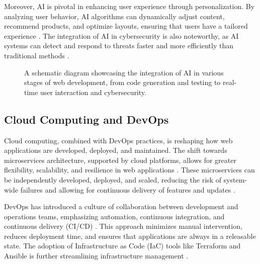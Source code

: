 Moreover, AI is pivotal in enhancing user experience through personalization. By analyzing user behavior, AI algorithms can dynamically adjust content, recommend products, and optimize layouts, ensuring that users have a tailored experience \cite{jones2023personalization}. The integration of AI in cybersecurity is also noteworthy, as AI systems can detect and respond to threats faster and more efficiently than traditional methods \cite{li2021cybersecurity}.

\begin{figure}[h]
    \centering
    \caption{A schematic diagram showcasing the integration of AI in various stages of web development, from code generation and testing to real-time user interaction and cybersecurity.}
    \label{fig:ai_integration_diagram}
\end{figure}

\subsection{Cloud Computing and DevOps}
Cloud computing, combined with DevOps practices, is reshaping how web applications are developed, deployed, and maintained. The shift towards microservices architecture, supported by cloud platforms, allows for greater flexibility, scalability, and resilience in web applications \cite{smith2020microservices}. These microservices can be independently developed, deployed, and scaled, reducing the risk of system-wide failures and allowing for continuous delivery of features and updates \cite{johnson2021cloud}.

DevOps has introduced a culture of collaboration between development and operations teams, emphasizing automation, continuous integration, and continuous delivery (CI/CD) \cite{martin2022devops}. This approach minimizes manual intervention, reduces deployment time, and ensures that applications are always in a releasable state. The adoption of Infrastructure as Code (IaC) tools like Terraform and Ansible is further streamlining infrastructure management \cite{brown2023iac}.


